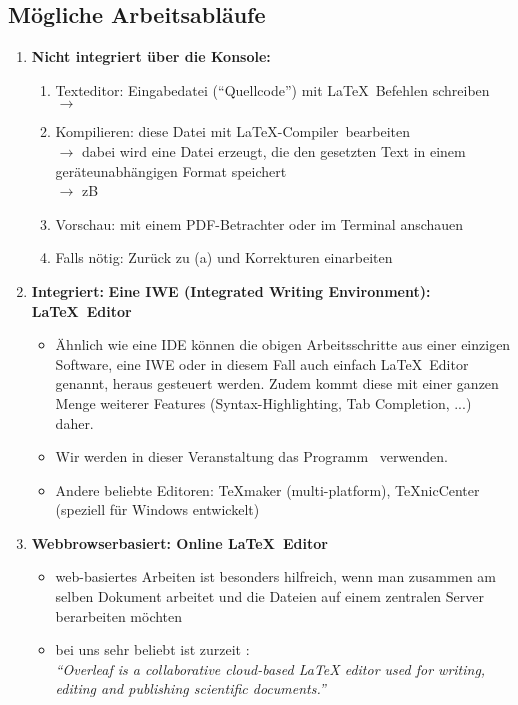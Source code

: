 \subsection{Mögliche Arbeitsabläufe}
\begin{enumerate}
	\item \textbf{Nicht integriert über die Konsole:}
	\begin{enumerate}
		\item Texteditor: Eingabedatei (``Quellcode'') mit \LaTeX~Befehlen schreiben\\ $\to$ 
		\item Kompilieren: diese Datei mit \LaTeX-Compiler~bearbeiten\\
		$\to$ dabei wird eine Datei erzeugt, die den gesetzten Text in einem geräteunabhängigen Format speichert\\
		$\to$ zB 
		\item Vorschau:  mit einem PDF-Betrachter oder im Terminal anschauen
		\item Falls nötig: Zurück zu (a) und Korrekturen einarbeiten
	\end{enumerate}
	
\item \textbf{Integriert:} \textbf{Eine IWE (Integrated Writing Environment): \LaTeX~Editor}
\begin{itemize}
	\item Ähnlich wie eine IDE können die obigen Arbeitsschritte aus einer einzigen Software, eine IWE oder in diesem Fall auch einfach \LaTeX~Editor genannt, heraus gesteuert werden. Zudem kommt diese mit einer ganzen Menge weiterer Features (Syntax-Highlighting, Tab Completion, ...) daher. 
\item Wir werden in dieser Veranstaltung das Programm \texstudio~verwenden.
\item Andere beliebte Editoren: TeXmaker (multi-platform), TeXnicCenter (speziell für Windows entwickelt)
\end{itemize}

\item \textbf{Webbrowserbasiert: Online \LaTeX~Editor}
\begin{itemize}
	\item web-basiertes Arbeiten ist besonders hilfreich, wenn man zusammen am selben Dokument arbeitet und die Dateien auf einem zentralen Server berarbeiten möchten
	\item bei uns sehr beliebt ist zurzeit :\\\textit{``Overleaf is a collaborative cloud-based LaTeX editor used for writing, editing and publishing scientific documents.''}
\end{itemize}
\end{enumerate}


